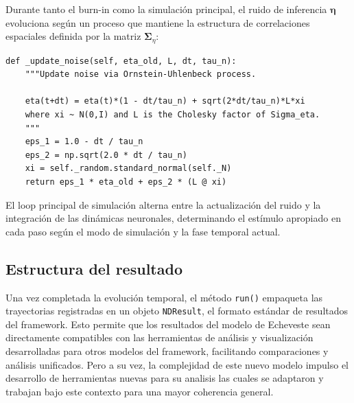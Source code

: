 Durante tanto el burn-in como la simulación principal, el ruido de inferencia $\boldsymbol{\eta}$ evoluciona según un proceso que mantiene la estructura de correlaciones espaciales definida por la matriz $\boldsymbol{\Sigma}_\eta$:

\begin{code}
\begin{verbatim}
def _update_noise(self, eta_old, L, dt, tau_n):
    """Update noise via Ornstein-Uhlenbeck process.
    
    eta(t+dt) = eta(t)*(1 - dt/tau_n) + sqrt(2*dt/tau_n)*L*xi
    where xi ~ N(0,I) and L is the Cholesky factor of Sigma_eta.
    """
    eps_1 = 1.0 - dt / tau_n
    eps_2 = np.sqrt(2.0 * dt / tau_n)
    xi = self._random.standard_normal(self._N)
    return eps_1 * eta_old + eps_2 * (L @ xi)
\end{verbatim}
\caption{Actualización del ruido correlacionado.}
\label{code:ou_noise}
\end{code}
\vspace{1.5em}

El loop principal de simulación alterna entre la actualización del ruido y la integración de las dinámicas neuronales, determinando el estímulo apropiado en cada paso según el modo de simulación y la fase temporal actual.

\subsection{Estructura del resultado}
\label{subsec:impl_resultado}

Una vez completada la evolución temporal, el método \texttt{run()} empaqueta las trayectorias registradas en un objeto \texttt{NDResult}, el formato estándar de resultados del framework. Esto permite que los resultados del modelo de Echeveste sean directamente compatibles con las herramientas de análisis y visualización desarrolladas para otros modelos del framework, facilitando comparaciones y análisis unificados. Pero a su vez, la complejidad de este nuevo modelo impulso el desarrollo de herramientas nuevas para su analisis las cuales se adaptaron y trabajan bajo este contexto para una mayor coherencia general.

